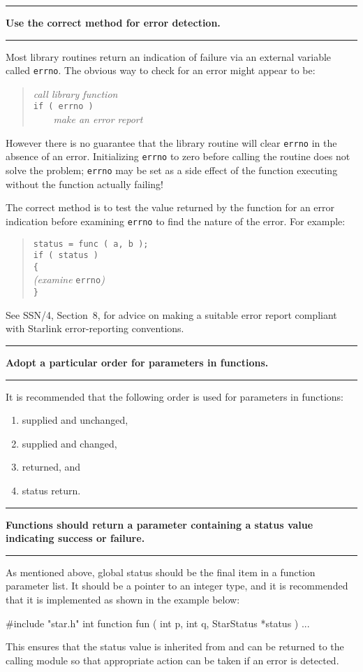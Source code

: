 \documentclass[twoside,11pt,nolof,noabs]{starlink}
\newcounter{sruleno}
\newcommand{\srule}[1]{
    \addtocounter{sruleno}{1}
    \goodbreak
    \rule{\textwidth}{0.3mm}
    \textbf{#1} \scpushright{\textbf{\thesruleno}}
    \rule{\textwidth}{0.1mm}
}
\begin{document}
\srule{Use the correct method for error detection.}
Most library routines return an indication of failure via an external
variable called \texttt{errno}.
The obvious way to check for an error might appear to be:
\begin{quote}
    {\sl call library function}\\
    \texttt{if ( errno )}\\
    {\sl  \ \ \ \ make an error report}
\end{quote}
However there is no guarantee that the library routine will clear \texttt{errno} in the absence of an error. Initializing \texttt{errno} to zero
before  calling the routine does not solve the problem;
\texttt{errno} may be set as
a side effect of the function executing without the function actually failing!

The correct method is to test the value returned by the function
for an error indication
before examining \texttt{errno} to find the nature of the error. For example:
\begin{quote}
      \texttt{status = func ( a, b );}\\
      \texttt{if ( status )}\\
      \texttt{\{}\\
      {\sl (examine} \texttt{errno}{\sl )}\\
      \texttt{\}}
\end{quote}
See SSN/4, Section~8,  for advice on making a suitable error report
compliant with Starlink error-reporting conventions.


\srule{Adopt a particular order for parameters in functions.}
It is recommended that the following order is used for parameters in
functions:
\begin{enumerate}
\item supplied and unchanged,
\item supplied and changed,
\item returned, and
\item status return.
\end{enumerate}


\srule{Functions should return a parameter containing a status value
indicating success or failure.}
As mentioned above, global status should be the final item
in a function parameter list.
It should be a pointer to an integer type, and it is recommended that it is
implemented as shown in the example below:
\begin{terminalv}
      #include "star.h"
      int function fun ( int p, int q, StarStatus *status )
      {
         ...
      }
\end{terminalv}
This ensures that the status value is inherited from and can be
returned to the calling module so that appropriate action can be
taken if an error is detected.
\end{document}
